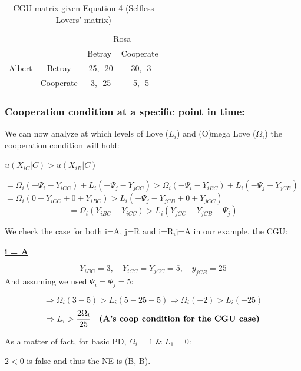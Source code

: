 \documentclass[11pt, a4paper]{article}
\begin{document}
\begin{table}[h]
\centering
\begin{tabular}{cc|c|c|}
\cline{3-4}
& & \multicolumn{2}{c|}{Rosa} \\ \cline{3-4}
& & Betray & Cooperate \\ \hline
\multicolumn{1}{|c|}{Albert} & Betray & -25, -20 & -30, -3 \\ \cline{2-4}
\multicolumn{1}{|c|}{} & Cooperate & -3, -25 & -5, -5 \\ \hline
\end{tabular}
\caption{CGU matrix given Equation 4 (Selfless Lovers' matrix)}
\label{your_label_here}
\end{table}

\subsubsection*{Cooperation condition at a specific point in time:}

We can now analyze at which levels of Love ($L_i$) and (O)mega Love ($\Omega_i$) the cooperation condition will hold:

\begin{center}
    $u(X_{iC} | C) > u(X_{iB} | C)$ 
\end{center}

\begin{center}
    $= \Omega_{i}(-\Psi_{i} - Y_{iCC}) + L_{i}(-\Psi_{j} - Y_{jCC}) > \Omega_{i}(-\Psi_{i} - Y_{iBC}) + L_{i}(-\Psi_{j} - Y_{jCB})$
    $= \Omega_{i}(0 - Y_{iCC} + 0 + Y_{iBC}) > L_{i}(-\Psi_{j} - Y_{jCB} + 0 + Y_{jCC})$
    \begin{equation}
        = \Omega_{i}(Y_{iBC} - Y_{iCC}) > L_{i}( Y_{jCC} - Y_{jCB} 
 - \Psi_{j})
    \end{equation}
\end{center}

We check the case for both i=A, j=R and i=R,j=A in our example, the CGU:

\textbf{\underline{i = A}}

$$
Y_{i B C}=3, \quad Y_{i C C}=Y_{j C C}=5, \quad y_{j C B}=25
$$
And assuming we used $\Psi_i=\Psi_j=5$:

$$
\Rightarrow \Omega_i(3-5)>L_i(5-25-5) \Rightarrow \Omega_i(-2)>L_i(-25)
$$
$$
\Rightarrow L_i > \frac{2 \Omega_i}{25} \quad \text{\textbf{(A's coop condition for the CGU case)}}
$$


As a matter of fact, for basic PD, $\Omega_i=1$ \&  $L_1=0$:

$2<0$ is false and thus the NE is (B,  B).
\end{document}
